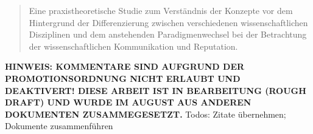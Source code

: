 \begin{abstract}Eine praxistheoretische Studie zum Verständnis der Konzepte vor dem Hintergrund der Differenzierung zwischen verschiedenen wissenschaftlichen Disziplinen und dem anstehenden Paradigmenwechsel bei der Betrachtung der wissenschaftlichen Kommunikation und Reputation.\end{abstract}

\textbf{HINWEIS: KOMMENTARE SIND AUFGRUND DER PROMOTIONSORDNUNG NICHT ERLAUBT UND DEAKTIVERT! DIESE ARBEIT IST IN BEARBEITUNG (ROUGH DRAFT) UND WURDE IM AUGUST AUS ANDEREN DOKUMENTEN ZUSAMMEGESETZT.}
Todos: Zitate übernehmen; Dokumente zusammenführen